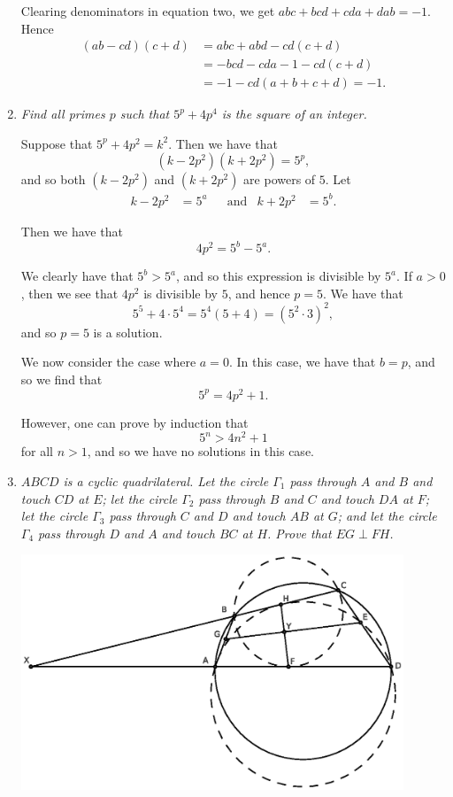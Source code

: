 \documentclass[a4paper,12pt]{article}
\begin{document}
\begin{enumerate}
	Clearing denominators in equation two, we get $abc +bcd +cda +dab = -1$. Hence \begin{align*} (ab-cd)(c+d) &= abc +abd -cd(c+d) \\ &= -bcd -cda -1 -cd(c+d) \\ &= -1 -cd(a+b+c+d) = -1.\end{align*}
	
	\item
	\textit{Find all primes $p$ such that $5^p +4p^4$ is the square of an integer.}
	
Suppose that $5^p + 4p^2 = k^2$. Then we have that
\[
	(k - 2p^2)(k + 2p^2) = 5^p,
\]
and so both $(k - 2p^2)$ and $(k + 2p^2)$ are powers of $5$. Let
\begin{align*}
	k - 2p^2 & = 5^a & & \text{and} & k + 2p^2 & = 5^b.
\end{align*}

Then we have that
\[
	4p^2 = 5^b - 5^a.
\]

We clearly have that $5^b > 5^a$, and so this expression is divisible by $5^a$.
If $a > 0$, then we see that $4p^2$ is divisible by $5$, and hence $p=5$.
We have that
\[
	5^5 + 4\cdot 5^4 = 5^4 (5 + 4) = (5^2 \cdot 3)^2,
\]
and so $p=5$ is a solution.

We now consider the case where $a=0$. In this case, we have that $b=p$, and so
we find that
\[
	5^p = 4p^2 + 1.
\]

However, one can prove by induction that
\[
	5^n > 4n^2 + 1
\]
for all $n > 1$, and so we have no solutions in this case.
	
	\item 
	\textit{$ABCD$ is a cyclic quadrilateral. Let the circle $\Gamma_1$ pass through $A$ and $B$ and touch $CD$ at $E$; let the circle $\Gamma_2$ pass through $B$ and $C$ and touch $DA$ at $F$; let the circle $\Gamma_3$ pass through $C$ and $D$ and touch $AB$ at $G$; and let the circle $\Gamma_4$ pass through $D$ and $A$ and touch $BC$ at $H$. Prove that $EG \perp FH$.}
	
    {\centering \includegraphics[width=0.9\textwidth]{T2Q4.eps} }
    

\end{enumerate}
\end{document}
